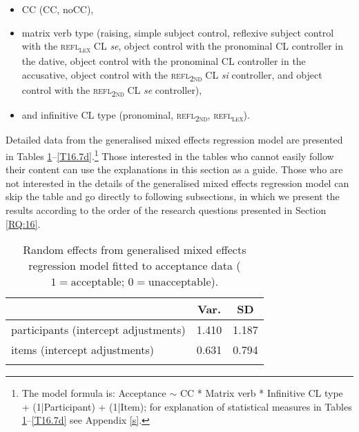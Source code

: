 \begin{itemize}
\item CC (CC, noCC), 
\item matrix verb type (raising, simple subject control, reflexive subject control with the \textsc{refl\textsubscript{\textsc{lex}}} CL \textit{se}, object control with the pronominal CL controller in the dative, object control with the pronominal CL controller in the accusative, object control with the \textsc{refl\textsubscript{2nd}} CL \textit{si} controller, and object control with the \textsc{refl\textsubscript{2nd}} CL \textit{se} controller), 
\item and infinitive CL type (pronominal, \textsc{refl\textsubscript{2nd}}, \textsc{refl\textsubscript{\textsc{lex}}}). 
\end{itemize}

Detailed data from the generalised mixed effects regression model are presented in Tables \ref{T16.7}--\ref{T16.7d}.\footnote{The model formula is: Acceptance $\sim$ CC * Matrix verb * Infinitive CL type + (1|Participant) + (1|Item); for explanation of statistical measures in Tables \ref{T16.7}--\ref{T16.7d} see Appendix \ref{s}.} Those interested in the tables who cannot easily follow their content can use the explanations in this section as a guide. Those who are not interested in the details of the generalised mixed effects regression model can skip the table and go directly to following subsections, in which we present the results according to the order of the research questions presented in Section \ref{RQ:16}.

\begin{table}
\caption{Random effects from generalised mixed effects regression model fitted to acceptance data ($1=\text{acceptable}$; $0=\text{unacceptable}$).\label{T16.7}}
\begin{tabular}{lrr}
\lsptoprule
                                     & \multicolumn{1}{c}{Var.} & \multicolumn{1}{c}{SD} \\\midrule
participants (intercept adjustments) & 1.410 & 1.187\\
items (intercept adjustments) & 0.631 & 0.794\\
\lspbottomrule
\end{tabular}
\end{table}


